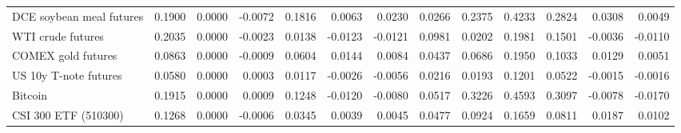 \begin{table}[!htbp]
\begin{adjustbox}{max width=\textwidth}
\begin{tabular}{lrrrrrrrrrrrr}
DCE soybean meal futures & 0.1900 & 0.0000 & -0.0072 & 0.1816 & 0.0063 & 0.0230 & 0.0266 & 0.2375 & 0.4233 & 0.2824 & 0.0308 & 0.0049\\
WTI crude futures & 0.2035 & 0.0000 & -0.0023 & 0.0138 & -0.0123 & -0.0121 & 0.0981 & 0.0202 & 0.1981 & 0.1501 & -0.0036 & -0.0110\\
COMEX gold futures & 0.0863 & 0.0000 & -0.0009 & 0.0604 & 0.0144 & 0.0084 & 0.0437 & 0.0686 & 0.1950 & 0.1033 & 0.0129 & 0.0051\\
US 10y T-note futures & 0.0580 & 0.0000 & 0.0003 & 0.0117 & -0.0026 & -0.0056 & 0.0216 & 0.0193 & 0.1201 & 0.0522 & -0.0015 & -0.0016\\
Bitcoin & 0.1915 & 0.0000 & 0.0009 & 0.1248 & -0.0120 & -0.0080 & 0.0517 & 0.3226 & 0.4593 & 0.3097 & -0.0078 & -0.0170\\
CSI 300 ETF (510300) & 0.1268 & 0.0000 & -0.0006 & 0.0345 & 0.0039 & 0.0045 & 0.0477 & 0.0924 & 0.1659 & 0.0811 & 0.0187 & 0.0102\\
\bottomrule
\end{tabular}
\end{adjustbox}
\end{table}